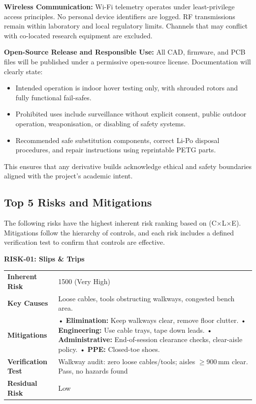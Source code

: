 \vspace{0.5em}
\textbf{Wireless Communication:}  
Wi-Fi telemetry operates under least-privilege access principles. No personal device identifiers are logged. RF transmissions remain within laboratory and local regulatory limits. Channels that may conflict with co-located research equipment are excluded.

\vspace{0.5em}
\textbf{Open-Source Release and Responsible Use:}  
All CAD, firmware, and PCB files will be published under a permissive open-source license. Documentation will clearly state:

\begin{itemize}
    \item Intended operation is indoor hover testing only, with shrouded rotors and fully functional fail-safes.
    \item Prohibited uses include surveillance without explicit consent, public outdoor operation, weaponisation, or disabling of safety systems.
    \item Recommended safe substitution components, correct Li-Po disposal procedures, and repair instructions using reprintable PETG parts.
\end{itemize}

This ensures that any derivative builds acknowledge ethical and safety boundaries aligned with the project's academic intent.

\subsection{Top 5 Risks and Mitigations}

The following risks have the highest inherent risk ranking based on (C×L×E). Mitigations follow the hierarchy of controls, and each risk includes a defined verification test to confirm that controls are effective.

\textbf{RISK-01: Slips \& Trips}

\begin{tabular}{@{}p{3cm}p{13cm}@{}}
\toprule
\textbf{Inherent Risk} & 1500 (Very High) \\
\textbf{Key Causes} & Loose cables, tools obstructing walkways, congested bench area. \\
\textbf{Mitigations} &
• \textbf{Elimination:} Keep walkways clear, remove floor clutter. \newline
• \textbf{Engineering:} Use cable trays, tape down leads. \newline
• \textbf{Administrative:} End-of-session clearance checks, clear-aisle policy. \newline
• \textbf{PPE:} Closed-toe shoes. \\
\textbf{Verification Test} & Walkway audit: zero loose cables/tools; aisles $\geq$900\,mm clear. Pass, no hazards found \\
\textbf{Residual Risk} & Low \\
\bottomrule
\end{tabular}
\vspace{0.6em}

